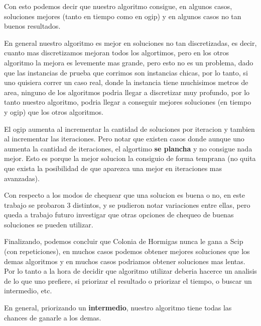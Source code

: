 Con esto podemos decir que nuestro algoritmo consigue, en algunos casos, soluciones mejores (tanto en tiempo como en ogip) y en algunos casos no tan buenos resultados. 

En general nuestro algoritmo es mejor en soluciones no tan discretizadas, es decir, cuanto mas discretizamos mejoran todos los algortimos, pero en los otros algoritmo la mejora es levemente mas grande, pero esto no es un problema, dado que las instancias de prueba que corrimos son instancias chicas, por lo tanto, si uno quisiera correr un caso real, donde la instancia tiene muchisimos metros de area, ninguno de los algoritmos podria llegar a discretizar muy profundo, por lo tanto nuestro algoritmo, podria llegar a conseguir mejores soluciones (en tiempo y ogip) que los otros algoritmos.

El ogip aumenta al incrementar la cantidad de soluciones por iteracion y tambien al incrementar las iteraciones. Pero notar que existen casos donde aunque uno aumenta la cantidad de iteraciones, el algortimo \textbf{se plancha} y no consigue nada mejor. Esto es porque la mejor solucion la consiguio de forma temprana (no quita que exista la posibilidad de que aparezca una mejor en iteraciones mas avanzadas).

Con respecto a los modos de chequear que una solucion es buena o no, en este trabajo se probaron 3 distintos, y se pudieron notar variaciones entre ellas, pero queda a trabajo futuro investigar que otras opciones de chequeo de buenas soluciones se pueden utilizar.

Finalizando, podemos concluir que Colonia de Hormigas nunca le gana a Scip (con repeticiones), en muchos casos podemos obtener mejores soluciones que los demas algoritmos y en muchos casos podriamos obtener soluciones mas lentas. Por lo tanto a la hora de decidir que algoritmo utilizar deberia hacerce un analisis de lo que uno prefiere, si priorizar el resultado o priorizar el tiempo, o buscar un intermedio, etc. 

En general, priorizando un \textbf{intermedio}, nuestro algoritmo tiene todas las chances de ganarle a los demas.